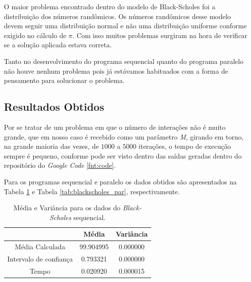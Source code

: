 \documentclass[11pt,twoside]{article}
\begin{document}
        O maior problema encontrado dentro do modelo de Black-Scholes foi a distribuição
        dos números randômicos. Os números randômicos desse modelo devem seguir uma distribuição 
        normal e não uma distribuição uniforme conforme exigido no cálculo de $\pi$. Com
        isso muitos problemas surgiram na hora de verificar se a solução aplicada estava
        correta.
        
        Tanto no desenvolvimento do programa sequencial quanto do programa paralelo
        não houve nenhum problema pois já estávamos habituados com a forma de pensamento
        para solucionar o problema.

    \subsection{Resultados Obtidos}

        Por se tratar de um problema em que o número de interações não é muito grande, que 
        em nosso caso é recebido como um parâmetro {\it M}, girando em torno, na grande maioria
        das vezes, de $1000$ a $5000$ iterações, o tempo de execução sempre é pequeno,
        conforme pode ser visto dentro das saídas geradas dentro do repositório do {\it Google
        Code} \ref{fnt:code}.
        
        Para os programas sequencial e paralelo os dados obtidos são apresentados na Tabela 
        \ref{tab:blackscholes_seq} e Tabela \ref{tab:blackscholes_par}, respectivamente.
        
        \begin{table}[ht]
        \centering
            \begin{tabular}{|c|c|c|}
             \hline
            & Média & Variância \\ \hline
            Média Calculada & 99.904995 & 0.000000 \\ \hline
            Intervalo de confiança & 0.793321 & 0.000000\\ \hline
            Tempo & 0.020920 & 0.000015 \\ \hline
            \end{tabular}
        \caption{Média e Variância para os dados do {\it Black-Scholes} sequencial.}
        \label{tab:blackscholes_seq}
        \end{table}
\end{document}
